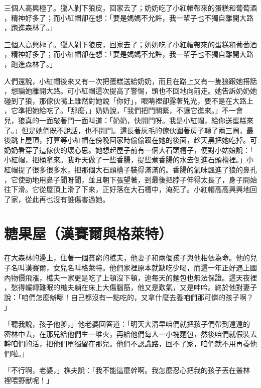 \documentclass[oneside,10pt]{memoir} %
\begin{document}
三個人高興極了。獵人剝下狼皮，回家去了；奶奶吃了小紅帽帶來的蛋糕和葡萄酒
，精神好多了；而小紅帽卻在想：「要是媽媽不允許，我一輩子也不獨自離開大路
，跑進森林了。」

三個人高興極了。獵人剝下狼皮，回家去了；奶奶吃了小紅帽帶來的蛋糕和葡萄酒
，精神好多了；而小紅帽卻在想：「要是媽媽不允許，我一輩子也不獨自離開大路
，跑進森林了。」

人們還說，小紅帽後來又有一次把蛋糕送給奶奶，而且在路上又有一隻狼跟她搭話
，想騙她離開大路。可小紅帽這次提高了警惕，頭也不回地向前走。她告訴奶奶她
碰到了狼，那傢伙嘴上雖然對她說「你好」，眼睛裡卻露著兇光，要不是在大路上
，它準把她給吃了。「那麼，」奶奶說，「我們把門關緊，不讓它進來。」不一會
兒，狼真的一面敲著門一面叫道：「奶奶，快開門呀。我是小紅帽，給你送蛋糕來
了。」但是她們既不說話，也不開門。這長著灰毛的傢伙圍著房子轉了兩三圈，最
後跳上屋頂，打算等小紅帽在傍晚回家時偷偷跟在她的後面，趁天黑把她吃掉。可
奶奶看穿了這傢伙的壞心思。她想起屋子前有一個大石頭槽子，便對小姑娘說：「
小紅帽，把桶拿來。我昨天做了一些香腸，提些煮香腸的水去倒進石頭槽裡。」小
紅帽提了很多很多水，把那個大石頭槽子裝得滿滿的。香腸的氣味飄進了狼的鼻孔
，它使勁地用鼻子聞呀聞，並且朝下張望著，到最後把脖子伸得太長了，身子開始
往下滑。它從屋頂上滑了下來，正好落在大石槽中，淹死了。小紅帽高高興興地回
了家，從此再也沒有誰傷害過她。


\chapter{糖果屋（漢賽爾與格萊特）}

在大森林的邊上，住著一個貧窮的樵夫，他妻子和兩個孩子與他相依為命。他的兒
子名叫漢賽爾，女兒名叫格萊特。他們家裡原本就缺吃少喝，而這一年正好遇上國
內物價飛漲，樵夫一家更是吃了上頓沒下頓，連每天的麵包也無法保證。這天夜裡
，愁得輾轉難眠的樵夫躺在床上大傷腦筋，他又是歎氣，又是呻吟。終於他對妻子
說：「咱們怎麼辦哪！自己都沒有一點吃的，又拿什麼去養咱們那可憐的孩子啊？
」

「聽我說，孩子他爹，」他老婆回答道：「明天大清早咱們就把孩子們帶到遠遠的
密林中去，在那兒給他們生一堆火，再給他們每人一小塊麵包，然後咱們就假裝去
幹咱們的活，把他們單獨留在那兒。他們不認識路，回不了家，咱們就不用再養他
們啦。」

「不行啊，老婆，」樵夫說：「我不能這麼幹啊。我怎麼忍心把我的孩子丟在叢林
裡喂野獸呢！」
\end{document}
